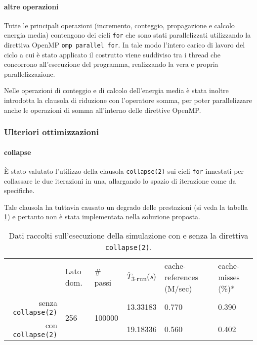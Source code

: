 \paragraph{altre operazioni}
Tutte le principali operazioni (incremento, conteggio, propagazione e calcolo
energia media) contengono dei cicli \texttt{for} che sono stati parallelizzati
utilizzando la direttiva OpenMP \texttt{omp parallel for}.  In tale modo
l'intero carico di lavoro del ciclo a cui è stato applicato il costrutto viene
suddiviso tra i thread che concorrono all'esecuzione del programma, realizzando
la vera e propria parallelizzazione.

Nelle operazioni di conteggio e di calcolo dell'energia media è stata inoltre
introdotta la clausola di riduzione con l'operatore somma, per poter
parallelizzare anche le operazioni di somma all'interno delle direttive OpenMP\@.

\subsubsection{Ulteriori ottimizzazioni}

\paragraph{collapse}

È stato valutato l'utilizzo della clausola \texttt{collapse(2)} sui cicli
\texttt{for} innestati per collassare le due iterazioni in una, allargando lo
spazio di iterazione come da specifiche\cite{openmp2018reference}.

Tale clausola ha tuttavia causato un degrado delle prestazioni (si veda la
tabella \ref{tab:collapse}) e pertanto non è stata implementata nella soluzione proposta.

\begin{table}[ht]
\begin{tabularx}{\linewidth}{rXXXXX}
\cmidrule[\heavyrulewidth]{2-6}
& Lato dom. & \# passi & $\overline{T}$\textsubscript{3-run}(\textit{s})
& cache-references (M/sec) & cache-misses (\%)*\\
\cmidrule[\lightrulewidth]{2-6}
senza \texttt{collapse(2)} & \multirow{2}{*}{256} & \multirow{2}{*}{100000} &
   13.33183 & 0.770 & 0.390\\
\cmidrule{4-6}
   con \texttt{collapse(2)} &&& 19.18336 & 0.560 & 0.402\\
\cmidrule[\heavyrulewidth]{2-6}
\end{tabularx}
\caption{\label{tab:collapse}Dati raccolti sull'esecuzione della simulazione con
e senza la direttiva \texttt{collapse(2)}.}
\end{table}

